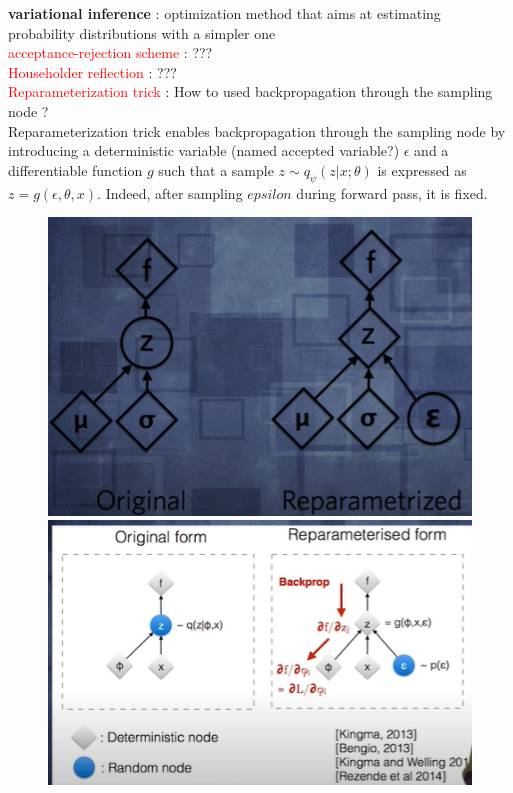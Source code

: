 \documentclass[12pt]{article}
\newcommand{\red}[1]{\textcolor{red}{#1}}
\begin{document}
\textbf{variational inference} : optimization method that aims at estimating probability distributions with a simpler one \\

\red{acceptance-rejection scheme} : ???  \\ 

\red{Householder reflection} : ??? \\ 

\red{Reparameterization trick} :
How to used backpropagation through the sampling node ? \\
Reparameterization trick enables backpropagation through the sampling node by introducing a deterministic variable (named accepted variable?) $\epsilon$ and a differentiable function $g$ 
such that a sample $z\sim q_\psi(z|x; \theta)$ is expressed as $z=g(\epsilon, \theta, x)$. Indeed, after sampling $epsilon$ during forward pass, it is fixed.
\begin{figure}[!h]
    \includegraphics[scale=0.4]{figures/reparametrization.png}
    \includegraphics[scale=0.4]{figures/reparam_backprop.png}
\end{figure}
\end{document}
